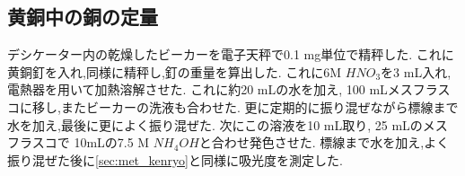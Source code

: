 \subsection{黄銅中の銅の定量}
デシケーター内の乾燥したビーカーを電子天秤で0.1 \si{\milli\gram}単位で精秤した.
これに黄銅釘を入れ,同様に精秤し,釘の重量を算出した.
これに6M $HNO_3$を3 \si{\milli L}入れ,電熱器を用いて加熱溶解させた.
これに約20 \si{\milli L}の水を加え, 100 \si{\milli L}メスフラスコに移し,またビーカーの洗液も合わせた.
更に定期的に振り混ぜながら標線まで水を加え,最後に更によく振り混ぜた.
次にこの溶液を10 \si{\milli L}取り, 25 \si{\milli L}のメスフラスコで 10\si{\milli L}の7.5 M $NH_4OH$と合わせ発色させた.
標線まで水を加え,よく振り混ぜた後に\ref{sec:met_kenryo}と同様に吸光度を測定した.

